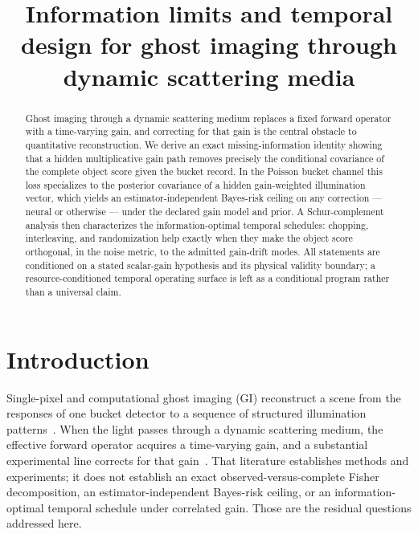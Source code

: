 \documentclass[11pt]{article}
\title{Information limits and temporal design for ghost imaging through
dynamic scattering media}
\author{\SPH{author block --- user decision}}
\date{}
\theoremstyle{remark}
\begin{document}
\maketitle

\begin{abstract}
Ghost imaging through a dynamic scattering medium replaces a fixed forward
operator with a time-varying gain, and correcting for that gain is the central
obstacle to quantitative reconstruction. We derive an exact
missing-information identity showing that a hidden multiplicative gain path
removes precisely the conditional covariance of the complete object score
given the bucket record. In the Poisson bucket channel this loss specializes to
the posterior covariance of a hidden gain-weighted illumination vector, which
yields an estimator-independent Bayes-risk ceiling on any correction --- neural
or otherwise --- under the declared gain model and prior. A Schur-complement
analysis then characterizes the information-optimal temporal schedules:
chopping, interleaving, and randomization help exactly when they make the
object score orthogonal, in the noise metric, to the admitted gain-drift
modes. All statements are conditioned on a stated scalar-gain hypothesis and
its physical validity boundary; a resource-conditioned temporal operating
surface is left as a conditional program rather than a universal claim.
\end{abstract}

\section{Introduction}
\label{sec:intro}
Single-pixel and computational ghost imaging (GI) reconstruct a scene from the
responses of one bucket detector to a sequence of structured illumination
patterns~\cite{duarte2008singlepixel,shapiro2008computational,edgar2019principles}.
When the light passes through a dynamic scattering medium, the effective
forward operator acquires a time-varying gain, and a substantial experimental
line corrects for that
gain~\cite{xiao2022temporal,pengchen2023,zhou2023dual,pengchen2024apl,hao2025photonlimited}.
That literature establishes methods and experiments; it does not establish an
exact observed-versus-complete Fisher decomposition, an estimator-independent
Bayes-risk ceiling, or an information-optimal temporal schedule under
correlated gain. Those are the residual questions addressed here.
\end{document}
